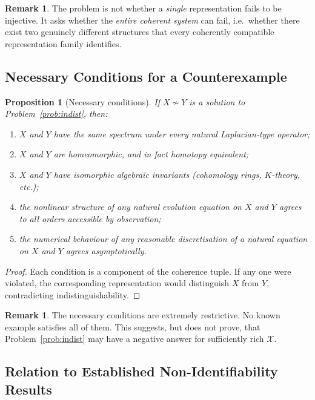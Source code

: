 \documentclass[11pt,a4paper]{article}
\theoremstyle{definition}
\newtheorem{remark}[definition]{Remark}
\theoremstyle{plain}
\newtheorem{proposition}[definition]{Proposition}
\newcommand{\Xcal}{\mathcal{X}}
\newcommand{\simadm}{\sim}
\begin{document}
\begin{remark}
The problem is not whether a \emph{single} representation fails to
be injective. It asks whether the \emph{entire coherent system} can
fail, i.e.\ whether there exist two genuinely different structures
that every coherently compatible representation family
identifies.
\end{remark}

\subsection{Necessary Conditions for a Counterexample}

\begin{proposition}[Necessary conditions]\label{prop:necessary}
If $X \not\simadm Y$ is a solution to
Problem~\ref{prob:indist}, then:
\begin{enumerate}[label=(\roman*)]
  \item $X$ and $Y$ have the same spectrum under every natural
        Laplacian-type operator;
  \item $X$ and $Y$ are homeomorphic, and in fact homotopy
        equivalent;
  \item $X$ and $Y$ have isomorphic algebraic invariants
        (cohomology rings, $K$-theory, etc.);
  \item the nonlinear structure of any natural evolution equation
        on $X$ and $Y$ agrees to all orders accessible by
        observation;
  \item the numerical behaviour of any reasonable discretisation of
        a natural equation on $X$ and $Y$ agrees asymptotically.
\end{enumerate}
\end{proposition}

\begin{proof}
Each condition is a component of the coherence tuple. If any one
were violated, the corresponding representation would distinguish
$X$ from $Y$, contradicting indistinguishability.
\end{proof}

\begin{remark}
The necessary conditions are extremely restrictive. No known
example satisfies all of them. This suggests, but does not prove,
that Problem~\ref{prob:indist} may have a negative answer for
sufficiently rich $\Xcal$.
\end{remark}

\subsection{Relation to Established Non-Identifiability Results}
\end{document}

